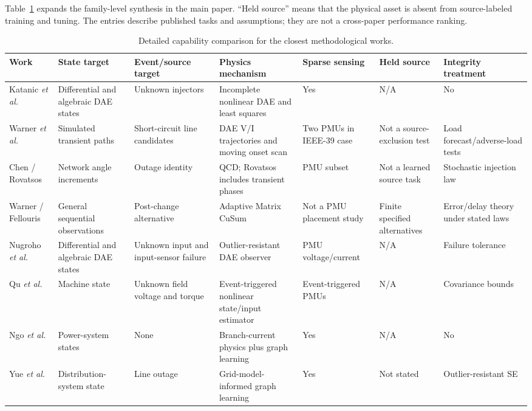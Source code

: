 \documentclass{ieeeaccess}
\begin{document}
Table~\ref{tab:supp-literature} expands the family-level synthesis in the main paper. ``Held source'' means that the physical asset is absent from source-labeled training and tuning. The entries describe published tasks and assumptions; they are not a cross-paper performance ranking.

\begin{table}[t]
\caption{Detailed capability comparison for the closest methodological works.}
\label{tab:supp-literature}
\centering
\scriptsize
\begin{tabularx}{\textwidth}{@{}lXXXXXX@{}}
\toprule
Work & State target & Event/source target & Physics mechanism & Sparse sensing & Held source & Integrity treatment \\
\midrule
Katanic \emph{et al.} \cite{katanic2024recursive} & Differential and algebraic DAE states & Unknown injectors & Incomplete nonlinear DAE and least squares & Yes & N/A & No \\
Warner \emph{et al.} \cite{warner2023highfidelity} & Simulated transient paths & Short-circuit line candidates & DAE V/I trajectories and moving onset scan & Two PMUs in IEEE-39 case & Not a source-exclusion test & Load forecast/adverse-load tests \\
Chen / Rovatsos \cite{chen2016quickest,rovatsos2017outage} & Network angle increments & Outage identity & QCD; Rovatsos includes transient phases & PMU subset & Not a learned source task & Stochastic injection law \\
Warner / Fellouris \cite{warner2024matrix} & General sequential observations & Post-change alternative & Adaptive Matrix CuSum & Not a PMU placement study & Finite specified alternatives & Error/delay theory under stated laws \\
Nugroho \emph{et al.} \cite{nugroho2022dae} & Differential and algebraic DAE states & Unknown input and input-sensor failure & Outlier-resistant DAE observer & PMU voltage/current & N/A & Failure tolerance \\
Qu \emph{et al.} \cite{qu2023joint} & Machine state & Unknown field voltage and torque & Event-triggered nonlinear state/input estimator & Event-triggered PMUs & N/A & Covariance bounds \\
Ngo \emph{et al.} \cite{ngo2024pignn} & Power-system states & None & Branch-current physics plus graph learning & Yes & N/A & No \\
Yue \emph{et al.} \cite{yue2024graph} & Distribution-system state & Line outage & Grid-model-informed graph learning & Yes & Not stated & Outlier-resistant SE \\

\end{tabularx}
\end{table}
\end{document}
